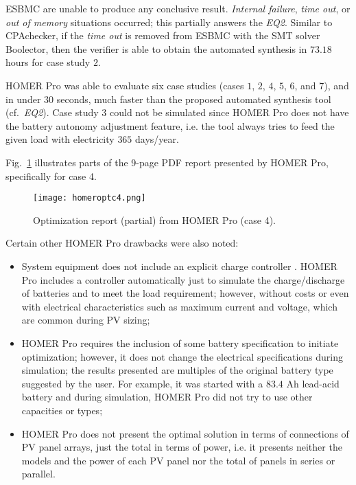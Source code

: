 ESBMC are unable to produce any conclusive result. \textit{Internal failure}, \textit{time out}, or \textit{out of memory} situations occurred; this partially answers the \textit{EQ2}.  Similar to CPAchecker, if the \textit{time out} is removed from ESBMC with the SMT solver Boolector, then the verifier is able to obtain the automated synthesis in $73.18$ hours for case study $2$. 

HOMER Pro was able to evaluate six case studies (cases $1$, $2$, $4$, $5$, $6$, and $7$), and in under $30$ seconds, much faster than the proposed automated synthesis tool (cf.~\textit{EQ2}). Case study $3$ could not be simulated since HOMER Pro does not have the battery autonomy adjustment feature, i.e. the tool always tries to feed the given load with electricity $365$ days/year. 

Fig.~\ref{fig:homeroptc4} illustrates parts of the 9-page PDF report presented by HOMER Pro, specifically for case 4.

\begin{figure}[h]
\texttt{[image: homeroptc4.png]}
\centering
\caption{Optimization report (partial) from HOMER Pro (case 4).}
\label{fig:homeroptc4}
\end{figure}

Certain other HOMER Pro drawbacks were also noted:

\begin{itemize}
\item System equipment does not include an explicit charge controller . HOMER Pro includes a controller automatically just to simulate the charge/discharge of batteries and to meet the load requirement; however, without costs or even with electrical characteristics such as maximum current and voltage, which are common during PV sizing;
\item HOMER Pro requires the inclusion of some battery specification to initiate optimization; however, it does not change the electrical specifications during simulation; the results presented are multiples of the original battery type suggested by the user. For example, it was started with a $83.4$ Ah lead-acid battery and during simulation, HOMER Pro did not try to use other capacities or types;
\item HOMER Pro does not present the optimal solution in terms of connections of PV panel arrays, just the total in terms of power, i.e. it presents neither the models and the power of each PV panel nor the total of panels in series or parallel.
\end{itemize}

